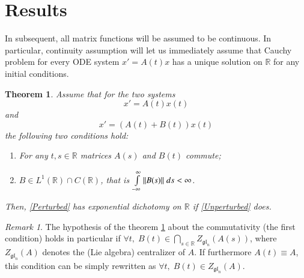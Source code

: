 \documentclass{elsarticle}
\newtheorem{theorem}{Theorem}
\theoremstyle{remark}
\newtheorem{remark}{Remark}
\begin{document}
\section{Results}
In subsequent, all matrix functions will be assumed to be continuous. 
In particular, continuity assumption will let us immediately assume
that Cauchy problem for every ODE system $x'=A(t)x$ has a unique solution on $\mathbb{R}$ for any initial conditions.
\begin{theorem}
	\label{strong}
	Assume that for the two systems 
	\begin{equation}\label{Unperturbed}
	x'=A(t)x(t)
	\end{equation}
	and
	\begin{equation}\label{Perturbed}
	x'=(A(t)+B(t))x(t)
	\end{equation}
	the following two conditions hold:
	\begin{enumerate}[(H1)]
	\item For any $t,s\in\mathbb{R}$ matrices $A(s)$ and $B(t)$ commute;
	\item $B\in L^1(\mathbb{R})\cap C(\mathbb{R})$, that is $\int_{-\infty}^{\infty}\mynorm{B(s)}\;ds<\infty$.
	\end{enumerate}
	Then, \eqref{Perturbed} has exponential dichotomy on $\mathbb{R}$ if \eqref{Unperturbed} does.
\end{theorem}
\begin{remark}The hypothesis of the theorem \ref{strong} about the commutativity (the first condition) holds in particular if
	$\forall t,\;B(t)\in\bigcap\limits_{s\in\mathbb{R}} Z_{\mathfrak{gl}_n}(A(s))$, where
	$Z_{\mathfrak{gl}_n}(A)$ denotes the (Lie algebra) centralizer of $A$.
	If furthermore $A(t)\equiv A$, this condition can be simply rewritten as $\forall t,\;B(t)\in Z_{\mathfrak{gl}_n}(A)$.\end{remark}
\end{document}
